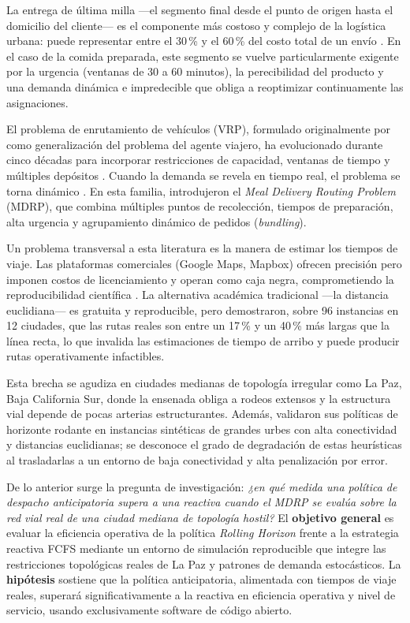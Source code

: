 \documentclass[12pt,letterpaper]{article}
\begin{document}
La entrega de última milla ---el segmento final desde el punto de origen hasta el
domicilio del cliente--- es el componente más costoso y complejo de la logística
urbana: puede representar entre el 30\,\% y el 60\,\% del costo total de un envío
\citep{Jazemi2023}. En el caso de la comida preparada, este segmento se vuelve
particularmente exigente por la urgencia (ventanas de 30 a 60 minutos), la
perecibilidad del producto y una demanda dinámica e impredecible que obliga a
reoptimizar continuamente las asignaciones.

El problema de enrutamiento de vehículos (VRP), formulado originalmente por
\citet{Dantzig1959} como generalización del problema del agente viajero, ha
evolucionado durante cinco décadas para incorporar restricciones de capacidad,
ventanas de tiempo y múltiples depósitos \citep{Laporte2009VRPSurvey}. Cuando la
demanda se revela en tiempo real, el problema se torna dinámico
\citep{Larsen2000DVRP,Pillac2013}. En esta familia, \citet{Reyes2018}
introdujeron el \textit{Meal Delivery Routing Problem} (MDRP), que combina
múltiples puntos de recolección, tiempos de preparación, alta urgencia y
agrupamiento dinámico de pedidos (\textit{bundling}).

Un problema transversal a esta literatura es la manera de estimar los tiempos de
viaje. Las plataformas comerciales (Google Maps, Mapbox) ofrecen precisión pero
imponen costos de licenciamiento y operan como caja negra, comprometiendo la
reproducibilidad científica \citep{Pereira2021}. La alternativa académica
tradicional ---la distancia euclidiana--- es gratuita y reproducible, pero
\citet{Boyaci2021} demostraron, sobre 96 instancias en 12 ciudades, que las rutas
reales son entre un 17\,\% y un 40\,\% más largas que la línea recta, lo que
invalida las estimaciones de tiempo de arribo y puede producir rutas
operativamente infactibles.

Esta brecha se agudiza en ciudades medianas de topología irregular como La Paz,
Baja California Sur, donde la ensenada obliga a rodeos extensos y la estructura
vial depende de pocas arterias estructurantes. Además, \citet{Reyes2018}
validaron sus políticas de horizonte rodante en instancias sintéticas de grandes
urbes con alta conectividad y distancias euclidianas; se desconoce el grado de
degradación de estas heurísticas al trasladarlas a un entorno de baja
conectividad y alta penalización por error.

De lo anterior surge la pregunta de investigación: \textit{¿en qué medida una
política de despacho anticipatoria supera a una reactiva cuando el MDRP se evalúa
sobre la red vial real de una ciudad mediana de topología hostil?} El
\textbf{objetivo general} es evaluar la eficiencia operativa de la política
\textit{Rolling Horizon} frente a la estrategia reactiva FCFS mediante un entorno
de simulación reproducible que integre las restricciones topológicas reales de La
Paz y patrones de demanda estocásticos. La \textbf{hipótesis} sostiene que la
política anticipatoria, alimentada con tiempos de viaje reales, superará
significativamente a la reactiva en eficiencia operativa y nivel de servicio,
usando exclusivamente software de código abierto.
\end{document}
